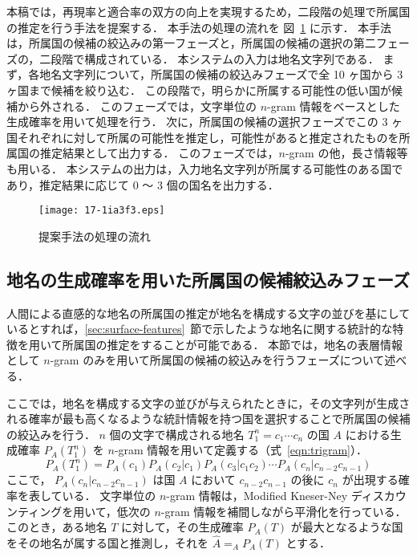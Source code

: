 \documentclass[japanese]{jnlp_1.4}
\newcommand{\argmax}{}
\begin{document}
本稿では，再現率と適合率の双方の向上を実現するため，二段階の処理で所属国の推定を行う手法を提案する．
本手法の処理の流れを 図~\ref{fig:system-overview} に示す．
本手法は，所属国の候補の絞込みの第一フェーズと，所属国の候補の選択の第二フェーズの，二段階で構成されている．
本システムの入力は地名文字列である．
まず，各地名文字列について，所属国の候補の絞込みフェーズで全 10 ヶ国から 3 ヶ国まで候補を絞り込む．
この段階で，明らかに所属する可能性の低い国が候補から外される．
このフェーズでは，文字単位の $n$-gram 情報をベースとした生成確率を用いて処理を行う．
次に，所属国の候補の選択フェーズでこの 3 ヶ国それぞれに対して所属の可能性を推定し，可能性があると推定されたものを所属国の推定結果として出力する．
このフェーズでは，$n$-gram の他，長さ情報等も用いる．
本システムの出力は，入力地名文字列が所属する可能性のある国であり，推定結果に応じて 0 〜 3 個の国名を出力する．

\begin{figure}[t]
 \begin{center}
  \texttt{[image: 17-1ia3f3.eps]}
 \end{center}
  \caption{提案手法の処理の流れ}
  \label{fig:system-overview}
\end{figure}

\subsection{地名の生成確率を用いた所属国の候補絞込みフェーズ}
\label{sec:automatic-area-identification-with-ngrams}

人間による直感的な地名の所属国の推定が地名を構成する文字の並びを基にしているとすれば，\ref{sec:surface-features}~節で示したような地名に関する統計的な特徴を用いて所属国の推定をすることが可能である．
本節では，地名の表層情報として $n$-gram のみを用いて所属国の候補の絞込みを行うフェーズについて述べる．

ここでは，地名を構成する文字の並びが与えられたときに，その文字列が生成される確率が最も高くなるような統計情報を持つ国を選択することで所属国の候補の絞込みを行う．
$n$ 個の文字で構成される地名 $ T_{1}^{n} = c_{1} \cdots c_{n} $ の国 $A$ における生成確率 $ P_A(T_{1}^{n}) $ を $n$-gram 情報を用いて定義する（式~\ref{eqn:trigram}）．
\begin{equation}
 P_{A}(T_{1}^{n}) = P_{A}(c_{1}) P_{A}(c_{2}|c_{1}) P_{A}(c_{3}|c_{1}c_{2}) \cdots P_{A}(c_{n}|c_{n-2}c_{n-1}) \label{eqn:trigram}
\end{equation}
ここで， $P_{A}(c_{n}|c_{n-2}c_{n-1})$ は国 $A$ において $c_{n-2} c_{n-1}$ の後に $c_{n}$ が出現する確率を表している．
文字単位の $n$-gram 情報は，Modified Kneser-Ney ディスカウンティングを用いて，低次の $n$-gram 情報を補間しながら平滑化を行っている．
このとき，ある地名 $T$ に対して，その生成確率 $P_{A}(T)$ が最大となるような国をその地名が属する国と推測し，それを $\hat{A} = \argmax_{A} P_{A}(T)$ とする．
\end{document}
